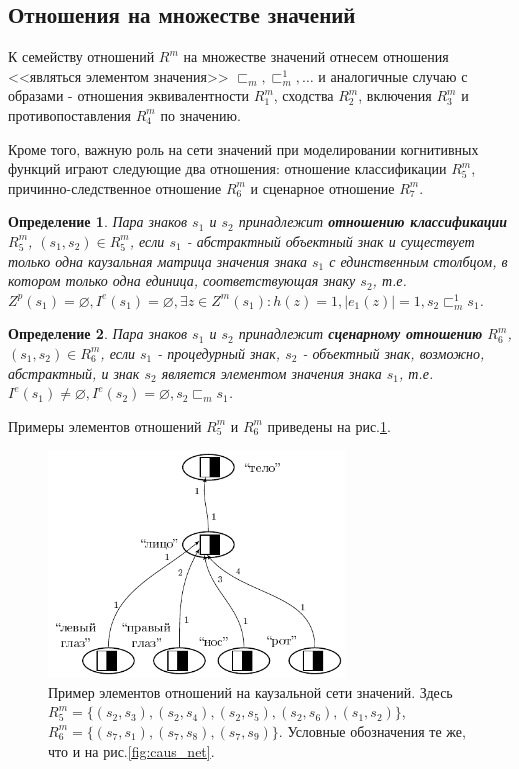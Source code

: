 \documentclass[12pt]{scrartcl}
\newtheorem{definition}{Определение}
\begin{document}
	\subsection{Отношения на множестве значений}	
	
	К семейству отношений $R^m$ на множестве значений отнесем отношения <<являться элементом значения>> ${\sqsubset_m,\sqsubset_m^1,\dots}$ и аналогичные случаю с образами - отношения эквивалентности $R_1^m$, сходства $R_2^m$, включения $R_3^m$ и противопоставления $R_4^m$ по значению.
	
	Кроме того, важную роль на сети значений при моделировании когнитивных функций играют следующие два отношения: отношение классификации $R_5^m$, причинно-следственное отношение $R_6^m$ и сценарное отношение $R_7^m$.
	
	\begin{definition}
		Пара знаков $s_1$ и $s_2$ принадлежит \textbf{отношению классификации} $R_5^m$, $(s_1,s_2)\in R_5^m$, если $s_1$ - абстрактный объектный знак и существует только одна каузальная матрица значения знака $s_1$ с единственным столбцом, в котором только одна единица, соответствующая знаку $s_2$, т.е. $Z^p(s_1)=\varnothing, I^e(s_1)=\varnothing, \exists z\in Z^m(s_1): h(z)=1, |e_1(z)|=1, s_2\sqsubset_m^1 s_1$.
	\end{definition}
	
	\begin{definition}
		Пара знаков $s_1$ и $s_2$ принадлежит \textbf{сценарному отношению} $R_6^m$, $(s_1,s_2)\in R_6^m$, если $s_1$ - процедурный знак, $s_2$ - объектный знак, возможно, абстрактный, и знак $s_2$ является элементом значения знака $s_1$, т.е. $I^e(s_1)\not = \varnothing, I^e(s_2) = \varnothing, s_2\sqsubset_m s_1$.
	\end{definition}
	
	Примеры элементов отношений $R_5^m$ и $R_6^m$ приведены на рис.\ref{fig:signif_relat}.
	
	\begin{figure}[h]
		\centering
		\includegraphics[width=0.7\textwidth,page=2]{examples/causnet/caus_net}
		\caption{Пример элементов отношений на каузальной сети значений. Здесь $R_5^m=\{(s_2,s_3),(s_2,s_4),(s_2,s_5),(s_2,s_6),(s_1,s_2)\}$, $R_6^m=\{(s_7,s_1),(s_7,s_8),(s_7,s_9)\}$. Условные обозначения те же, что и на рис.\ref{fig:caus_net}.}
		\label{fig:signif_relat}		
	\end{figure}
	
\end{document}

